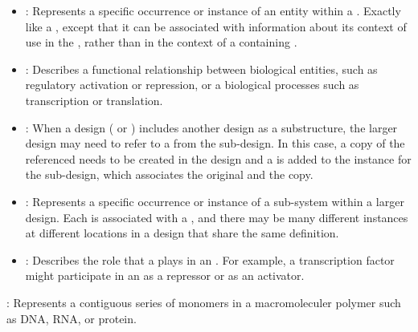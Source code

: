 \begin{description}
\begin{itemize}
\item \emph{}:
Represents a specific occurrence or instance of an entity within a .
Exactly like a , except that it can be associated with information about its context of use in the , rather than in the context of a containing .

\item \emph{}:
Describes a functional relationship between biological entities, such as regulatory activation or repression, or a biological processes such as transcription or translation.

\item \emph{}:
When a design ( or ) includes another design as a substructure, the larger design may need to refer to a  from the sub-design.
In this case, a copy of the referenced  needs to be created in the design and a  is added to the instance for the sub-design, which associates the original and the copy.

\item \emph{}:
Represents a specific occurrence or instance of a sub-system within a larger design.
Each  is associated with a , and there may be many different instances at different locations in a design that share the same definition.

\item \emph{}:
Describes the role that a  plays in an .
For example, a transcription factor might participate in an  as a repressor or as an activator.

\end{itemize}

\item \emph{}:
Represents a contiguous series of monomers in a macromoleculer polymer such as DNA, RNA, or protein. 

\end{description}